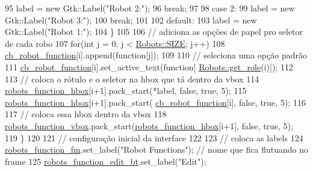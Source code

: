 \begin{DoxyCode}
95                 label = \textcolor{keyword}{new} Gtk::Label(\textcolor{stringliteral}{"Robot 2:"});
96                 \textcolor{keywordflow}{break};
97 
98             \textcolor{keywordflow}{case} 2:
99                 label = \textcolor{keyword}{new} Gtk::Label(\textcolor{stringliteral}{"Robot 3:"});
100                 \textcolor{keywordflow}{break};
101 
102             \textcolor{keywordflow}{default}:
103                 label = \textcolor{keyword}{new} Gtk::Label(\textcolor{stringliteral}{"Robot 1:"});
104         \}
105 
106         \textcolor{comment}{// adiciona as opções de papel pro seletor de cada robo}
107         \textcolor{keywordflow}{for}(\textcolor{keywordtype}{int} j = 0; j < \hyperlink{class_robots_ae9df2f1d345ad6740f0459956cdd4712}{Robots::SIZE}; j++)
108             \hyperlink{class_robot_g_u_i_ab1e977d6ae4bcf57e4306f017695eeeb}{cb\_robot\_function}[i].append(\textcolor{keyword}{function}[j]);
109 
110         \textcolor{comment}{// seleciona uma opção padrão}
111         \hyperlink{class_robot_g_u_i_ab1e977d6ae4bcf57e4306f017695eeeb}{cb\_robot\_function}[i].set\_active\_text(\textcolor{keyword}{function}[
      \hyperlink{class_robots_ac5cdd16502bd325581fb2d732169a326}{Robots::get\_role}(i)]);
112 
113         \textcolor{comment}{// coloca o rótulo e o seletor na hbox que tá dentro da vbox}
114         \hyperlink{class_robot_g_u_i_aba8f9fd9d3cfea4e5b4fe262ac6e3c0b}{robots\_function\_hbox}[i+1].pack\_start(*label, \textcolor{keyword}{false}, \textcolor{keyword}{true}, 5);
115         \hyperlink{class_robot_g_u_i_aba8f9fd9d3cfea4e5b4fe262ac6e3c0b}{robots\_function\_hbox}[i+1].pack\_start(
      \hyperlink{class_robot_g_u_i_ab1e977d6ae4bcf57e4306f017695eeeb}{cb\_robot\_function}[i], \textcolor{keyword}{false}, \textcolor{keyword}{true}, 5);
116 
117         \textcolor{comment}{// coloca essa hbox dentro da vbox}
118         \hyperlink{class_robot_g_u_i_a6d09ae30b925d6efd7c16e20b21c1781}{robots\_function\_vbox}.pack\_start(\hyperlink{class_robot_g_u_i_aba8f9fd9d3cfea4e5b4fe262ac6e3c0b}{robots\_function\_hbox}[i+1], \textcolor{keyword}{
      false}, \textcolor{keyword}{true}, 5);
119     \}
120 
121     \textcolor{comment}{// configuração inicial da interface}
122 
123     \textcolor{comment}{// coloca as labels}
124     \hyperlink{class_robot_g_u_i_af29bd5e935aaf337c5e2afaa4dd2119a}{robots\_function\_fm}.set\_label(\textcolor{stringliteral}{"Robot Functions"}); \textcolor{comment}{// nome que fica flutuando no frame}
125     \hyperlink{class_robot_g_u_i_ac474c7d61bd07aaf26f75acb691e2971}{robots\_function\_edit\_bt}.set\_label(\textcolor{stringliteral}{"Edit"});

\end{DoxyCode}
